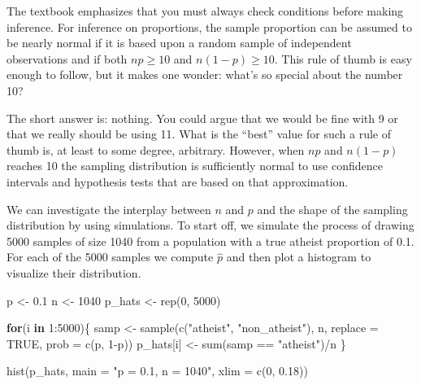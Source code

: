 \documentclass[
]{article}
\newenvironment{Shaded}{\begin{snugshade}}{\end{snugshade}}
\newcommand{\AttributeTok}[1]{\textcolor[rgb]{0.77,0.63,0.00}{#1}}
\newcommand{\ConstantTok}[1]{\textcolor[rgb]{0.00,0.00,0.00}{#1}}
\newcommand{\ControlFlowTok}[1]{\textcolor[rgb]{0.13,0.29,0.53}{\textbf{#1}}}
\newcommand{\DecValTok}[1]{\textcolor[rgb]{0.00,0.00,0.81}{#1}}
\newcommand{\FloatTok}[1]{\textcolor[rgb]{0.00,0.00,0.81}{#1}}
\newcommand{\FunctionTok}[1]{\textcolor[rgb]{0.00,0.00,0.00}{#1}}
\newcommand{\NormalTok}[1]{#1}
\newcommand{\OtherTok}[1]{\textcolor[rgb]{0.56,0.35,0.01}{#1}}
\newcommand{\SpecialCharTok}[1]{\textcolor[rgb]{0.00,0.00,0.00}{#1}}
\newcommand{\StringTok}[1]{\textcolor[rgb]{0.31,0.60,0.02}{#1}}
\begin{document}
The textbook emphasizes that you must always check conditions before
making inference. For inference on proportions, the sample proportion
can be assumed to be nearly normal if it is based upon a random sample
of independent observations and if both \(np \geq 10\) and
\(n(1 - p) \geq 10\). This rule of thumb is easy enough to follow, but
it makes one wonder: what's so special about the number 10?

The short answer is: nothing. You could argue that we would be fine with
9 or that we really should be using 11. What is the ``best'' value for
such a rule of thumb is, at least to some degree, arbitrary. However,
when \(np\) and \(n(1-p)\) reaches 10 the sampling distribution is
sufficiently normal to use confidence intervals and hypothesis tests
that are based on that approximation.

We can investigate the interplay between \(n\) and \(p\) and the shape
of the sampling distribution by using simulations. To start off, we
simulate the process of drawing 5000 samples of size 1040 from a
population with a true atheist proportion of 0.1. For each of the 5000
samples we compute \(\hat{p}\) and then plot a histogram to visualize
their distribution.

\begin{Shaded}
\begin{Highlighting}[]
\NormalTok{p }\OtherTok{\textless{}{-}} \FloatTok{0.1}
\NormalTok{n }\OtherTok{\textless{}{-}} \DecValTok{1040}
\NormalTok{p\_hats }\OtherTok{\textless{}{-}} \FunctionTok{rep}\NormalTok{(}\DecValTok{0}\NormalTok{, }\DecValTok{5000}\NormalTok{)}

\ControlFlowTok{for}\NormalTok{(i }\ControlFlowTok{in} \DecValTok{1}\SpecialCharTok{:}\DecValTok{5000}\NormalTok{)\{}
\NormalTok{  samp }\OtherTok{\textless{}{-}} \FunctionTok{sample}\NormalTok{(}\FunctionTok{c}\NormalTok{(}\StringTok{"atheist"}\NormalTok{, }\StringTok{"non\_atheist"}\NormalTok{), n, }\AttributeTok{replace =} \ConstantTok{TRUE}\NormalTok{, }\AttributeTok{prob =} \FunctionTok{c}\NormalTok{(p, }\DecValTok{1}\SpecialCharTok{{-}}\NormalTok{p))}
\NormalTok{  p\_hats[i] }\OtherTok{\textless{}{-}} \FunctionTok{sum}\NormalTok{(samp }\SpecialCharTok{==} \StringTok{"atheist"}\NormalTok{)}\SpecialCharTok{/}\NormalTok{n}
\NormalTok{\}}

\FunctionTok{hist}\NormalTok{(p\_hats, }\AttributeTok{main =} \StringTok{"p = 0.1, n = 1040"}\NormalTok{, }\AttributeTok{xlim =} \FunctionTok{c}\NormalTok{(}\DecValTok{0}\NormalTok{, }\FloatTok{0.18}\NormalTok{))}
\end{Highlighting}
\end{Shaded}
\end{document}
